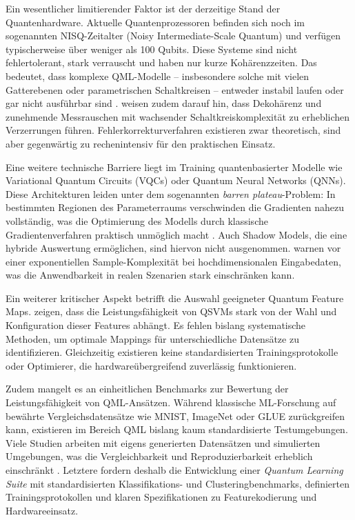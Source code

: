 Ein wesentlicher limitierender Faktor ist der derzeitige Stand der Quantenhardware. Aktuelle Quantenprozessoren befinden sich noch im sogenannten NISQ-Zeitalter (Noisy Intermediate-Scale Quantum) und verfügen typischerweise über weniger als 100 Qubits. Diese Systeme sind nicht fehlertolerant, stark verrauscht und haben nur kurze Kohärenzzeiten. Das bedeutet, dass komplexe QML-Modelle – insbesondere solche mit vielen Gatterebenen oder parametrischen Schaltkreisen – entweder instabil laufen oder gar nicht ausführbar sind \cite{peral-garciaSystematicLiteratureReview2024} \cite{gujjuQuantumMachineLearning2024}. \cite{tychola_quantum_2023} weisen zudem darauf hin, dass Dekohärenz und zunehmende Messrauschen mit wachsender Schaltkreiskomplexität zu erheblichen Verzerrungen führen. Fehlerkorrekturverfahren existieren zwar theoretisch, sind aber gegenwärtig zu rechenintensiv für den praktischen Einsatz.

Eine weitere technische Barriere liegt im Training quantenbasierter Modelle wie Variational Quantum Circuits (VQCs) oder Quantum Neural Networks (QNNs). Diese Architekturen leiden unter dem sogenannten \textit{barren plateau}-Problem: In bestimmten Regionen des Parameterraums verschwinden die Gradienten nahezu vollständig, was die Optimierung des Modells durch klassische Gradientenverfahren praktisch unmöglich macht \cite{liuQuantumTrainRethinkingHybrid2024} \cite{tychola_quantum_2023}. Auch Shadow Models, die eine hybride Auswertung ermöglichen, sind hiervon nicht ausgenommen. \cite{jerbiShadowsQuantumMachine2024} warnen vor einer exponentiellen Sample-Komplexität bei hochdimensionalen Eingabedaten, was die Anwendbarkeit in realen Szenarien stark einschränken kann.

Ein weiterer kritischer Aspekt betrifft die Auswahl geeigneter Quantum Feature Maps. \cite{kavithaQuantumMachineLearning2024} zeigen, dass die Leistungsfähigkeit von QSVMs stark von der Wahl und Konfiguration dieser Features abhängt. Es fehlen bislang systematische Methoden, um optimale Mappings für unterschiedliche Datensätze zu identifizieren. Gleichzeitig existieren keine standardisierten Trainingsprotokolle oder Optimierer, die hardwareübergreifend zuverlässig funktionieren.

Zudem mangelt es an einheitlichen Benchmarks zur Bewertung der Leistungsfähigkeit von QML-Ansätzen. Während klassische ML-Forschung auf bewährte Vergleichsdatensätze wie MNIST, ImageNet oder GLUE zurückgreifen kann, existieren im Bereich QML bislang kaum standardisierte Testumgebungen. Viele Studien arbeiten mit eigens generierten Datensätzen und simulierten Umgebungen, was die Vergleichbarkeit und Reproduzierbarkeit erheblich einschränkt \cite{gujjuQuantumMachineLearning2024}. Letztere fordern deshalb die Entwicklung einer \textit{Quantum Learning Suite} mit standardisierten Klassifikations- und Clusteringbenchmarks, definierten Trainingsprotokollen und klaren Spezifikationen zu Featurekodierung und Hardwareeinsatz.


